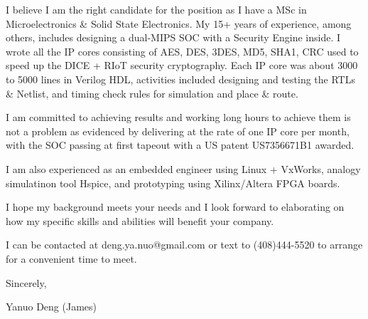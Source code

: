 { \bigbreak } 
I believe I am the right candidate for the position as I have a MSc in Microelectronics \& Solid State Electronics.
My 15+ years of experience, among others, 
includes designing a dual-MIPS SOC with a Security Engine inside. 
I wrote all the IP cores consisting of AES, DES, 3DES, MD5, SHA1, CRC 
used to speed up the DICE + RIoT security cryptography.
Each IP core was about 3000 to 5000 lines in Verilog HDL, 
activities included designing and testing the RTLs \& Netlist,
and timing check rules for simulation and place \& route.

{ \bigbreak } 
I am committed to achieving results and working long hours 
to achieve them is not a problem as evidenced by 
delivering at the rate of one IP core per month,
with the SOC passing at first tapeout
with a US patent US7356671B1 awarded.

{ \bigbreak } 
I am also experienced as an embedded engineer using Linux + VxWorks, 
analogy simulatinon tool Hspice, 
and prototyping using Xilinx/Altera FPGA boards.

{ \bigbreak } 
I hope my background meets your needs and I look
forward to elaborating on how my specific skills and abilities will benefit your company.

{ \bigbreak } 
I can be contacted at deng.ya.nuo@gmail.com
or text to (408)444-5520 to arrange for a convenient time to meet.

{ \bigbreak } 




\vskip 60pt

{ \bigbreak } 
Sincerely,

Yanuo Deng (James)

\bye
